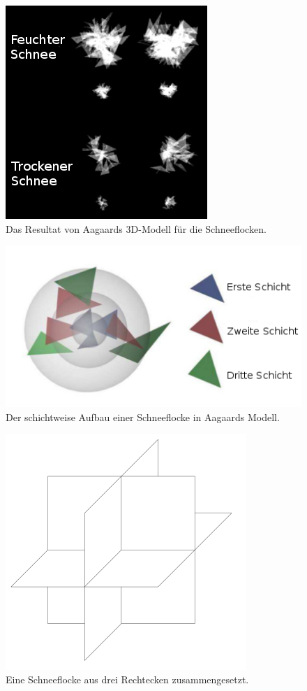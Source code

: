 \begin{figure}[ht]
    \centering
    \includegraphics{images/aagaard_layer_model}
    \caption{Das Resultat von Aagaards 3D-Modell für die Schneeflocken.}
\label{fig:implementation_aagaard_layer_model}
\end{figure}

\begin{figure}[ht]
    \centering
    \includegraphics{images/aagaard_spheres}
    \caption{Der schichtweise Aufbau einer Schneeflocke in Aagaards Modell.}
\label{fig:implementation_aagaard_spheres}
\end{figure}

\begin{figure}[ht]
    \centering
    \includegraphics{images/snowflake_three_rectangles}
    \caption{Eine Schneeflocke aus drei Rechtecken zusammengesetzt.}
\label{fig:implementation_snowflake_three_rectangles}
\end{figure}

